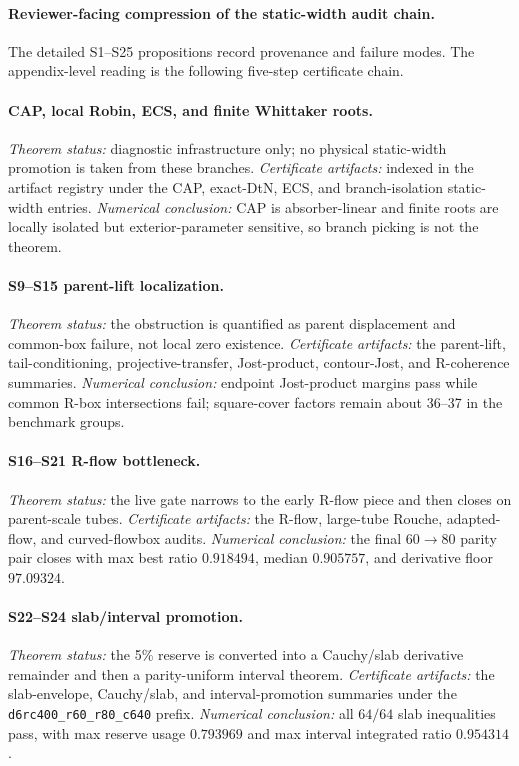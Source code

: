 \documentclass[aps,prd,onecolumn,notitlepage,nofootinbib,superscriptaddress,11pt,floatfix]{revtex4-2}
\begin{document}
\paragraph{Reviewer-facing compression of the static-width audit chain.}
The detailed S1--S25 propositions record provenance and failure modes.  The appendix-level reading is the following five-step certificate chain.

\paragraph{CAP, local Robin, ECS, and finite Whittaker roots.}
\emph{Theorem status:} diagnostic infrastructure only; no physical static-width promotion is taken from these branches.
\emph{Certificate artifacts:} indexed in the artifact registry under the CAP, exact-DtN, ECS, and branch-isolation static-width entries.
\emph{Numerical conclusion:} CAP is absorber-linear and finite roots are locally isolated but exterior-parameter sensitive, so branch picking is not the theorem.

\paragraph{S9--S15 parent-lift localization.}
\emph{Theorem status:} the obstruction is quantified as parent displacement and common-box failure, not local zero existence.
\emph{Certificate artifacts:} the parent-lift, tail-conditioning, projective-transfer, Jost-product, contour-Jost, and R-coherence summaries.
\emph{Numerical conclusion:} endpoint Jost-product margins pass while common R-box intersections fail; square-cover factors remain about 36--37 in the benchmark groups.

\paragraph{S16--S21 R-flow bottleneck.}
\emph{Theorem status:} the live gate narrows to the early R-flow piece and then closes on parent-scale tubes.
\emph{Certificate artifacts:} the R-flow, large-tube Rouche, adapted-flow, and curved-flowbox audits.
\emph{Numerical conclusion:} the final \(60\to80\) parity pair closes with max best ratio \(0.918494\), median \(0.905757\), and derivative floor \(97.09324\).

\paragraph{S22--S24 slab/interval promotion.}
\emph{Theorem status:} the 5\% reserve is converted into a Cauchy/slab derivative remainder and then a parity-uniform interval theorem.
\emph{Certificate artifacts:} the slab-envelope, Cauchy/slab, and interval-promotion summaries under the \texttt{d6rc400\_r60\_r80\_c640} prefix.
\emph{Numerical conclusion:} all \(64/64\) slab inequalities pass, with max reserve usage \(0.793969\) and max interval integrated ratio \(0.954314\).
\end{document}

